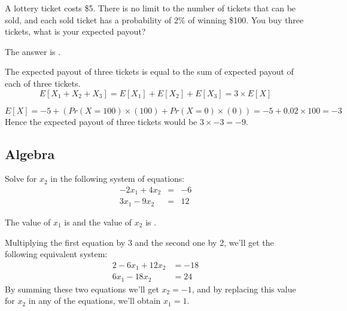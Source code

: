 \begin{question}
A lottery ticket costs \$5. 
There is no limit to the number of tickets that can be sold, and each sold ticket has a probability of 2\% of winning \$100.
You buy three tickets, what is your expected payout?

\begin{solution}
The answer is .
\end{solution}

The expected payout of three tickets is equal to the sum of expected payout of each of three tickets. 
\begin{equation*}
E[X_1 + X_2 + X_3] = E[X_1] + E[X_2] + E[X_3] = 3 \times E[X]
\end{equation*}

\begin{equation*}
E[X] = -5 + \left(Pr(X = 100) \times (100) + Pr(X = 0) \times (0)\right) = -5 + 0.02 \times 100 = -3
\end{equation*}
Hence the expected payout of three tickets would be $3 \times -3 = -9$.
\end{question}


\subsection*{Algebra}

\begin{question}
Solve for $x_2$ in the following system of equations:
\begin{eqnarray*}
-2x_1 + 4x_2 & = &-6\\
3x_1  - 9x_2 & = & 12 
\end{eqnarray*}
\vspace*{13pt}
\begin{solution}
The value of $x_1$ is  and the value of $x_2$ is .
\end{solution}
Multiplying the first equation by 3 and the second one by 2, we'll get the following equivalent system:
\begin{alignat*}{2}
 -6  x_1  + 12  x_2 & = -18 \\
 6  x_1  - 18  x_2 & = 24
\end{alignat*}
By summing these two equations we'll get $x_2 = -1$, and by replacing this value for $x_2$ in any of the equations, we'll obtain $x_1 = 1$.
\end{question}


